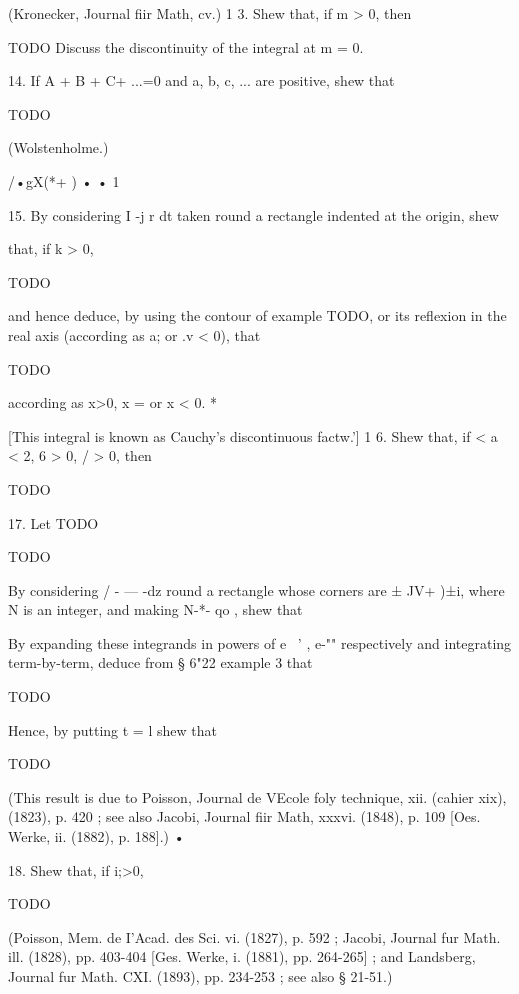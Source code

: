 (Kronecker, Journal fiir Math, cv.) 1 3. Shew that, if m > 0, then

TODO
Discuss the discontinuity of the integral at m = 0.

14. If A + B + C+ ...=0 and a, b, c, ... are positive, shew that

TODO

(Wolstenholme.)

/•gX(*+ ) • • 1

15. By considering I -j r dt taken round a rectangle indented at the
origin, shew

that, if k > 0,

TODO

and hence deduce, by using the contour of  example TODO, or its
reflexion in the real axis (according as a; or .v < 0), that

TODO

according as x>0, x = or x < 0. *

[This integral is known as Cauchy's discontinuous factw.'] 1 6. Shew
that, if < a < 2, 6 > 0, / > 0, then

TODO

%
%

17. Let TODO

TODO

By considering / - — -dz round a rectangle whose corners are ± JV+
)±i, where N is an integer, and making N-*- qo , shew that

By expanding these integrands in powers of e~ ' , e-"" respectively
and integrating term-by-term, deduce from § 6"22 example 3 that

TODO

Hence, by putting t = l shew that

TODO

(This result is due to Poisson, Journal de VEcole foly technique, xii.
(cahier xix), (1823), p. 420 ; see also Jacobi, Journal fiir Math,
xxxvi. (1848), p. 109 [Oes. Werke, ii. (1882), p. 188].) •

18. Shew that, if i;>0,

TODO

(Poisson, Mem. de I'Acad. des Sci. vi. (1827), p. 592 ; Jacobi,
Journal fur Math. ill. (1828), pp. 403-404 [Ges. Werke, i. (1881), pp.
264-265] ; and Landsberg, Journal fur Math. CXI. (1893), pp. 234-253 ;
see also § 21-51.)


